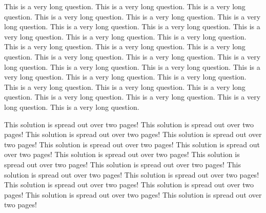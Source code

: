 This is a very long question. This is a very long question. This is a very long question. This is a very long question. This is a very long question. This is a very long question. This is a very long question. This is a very long question. This is a very long question. This is a very long question. This is a very long question. This is a very long question. This is a very long question. This is a very long question. This is a very long question. This is a very long question. This is a very long question. This is a very long question. This is a very long question. This is a very long question. This is a very long question. This is a very long question. This is a very long question. This is a very long question. This is a very long question. This is a very long question. This is a very long question. This is a very long question. This is a very long question.

\begin{solution}
	This solution is spread out over two pages!
	This solution is spread out over two pages!
	This solution is spread out over two pages!
	This solution is spread out over two pages!
	This solution is spread out over two pages!
	This solution is spread out over two pages!
	This solution is spread out over two pages!
	This solution is spread out over two pages!
	This solution is spread out over two pages!
	This solution is spread out over two pages!
	This solution is spread out over two pages!
	This solution is spread out over two pages!
	This solution is spread out over two pages!
	This solution is spread out over two pages!
	This solution is spread out over two pages!
\end{solution}
